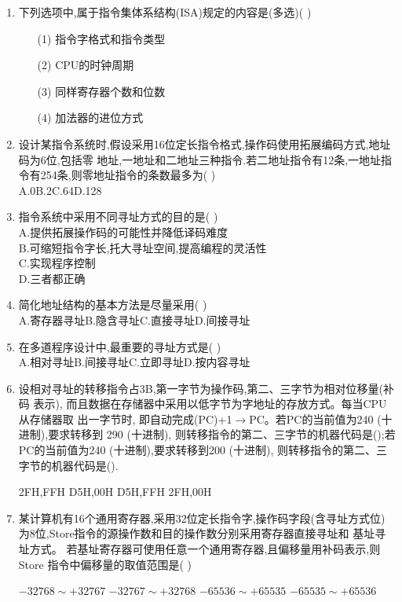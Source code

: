\documentclass[12pt, a4paper, oneside, UTF8]{ctexbook}
\begin{document}
\begin{enumerate}
    \item \bt 下列选项中,属于指令集体系结构(ISA)规定的内容是(多选)(    )
    \begin{enumerate}
        \item [(1)] 指令字格式和指令类型 
        \item [(2)] CPU的时钟周期 
        \item [(3)] 同样寄存器个数和位数 
        \item [(4)] 加法器的进位方式
    \end{enumerate}

    \item \bt 设计某指令系统时,假设采用16位定长指令格式,操作码使用拓展编码方式,地址码为6位,包括零
    地址,一地址和二地址三种指令.若二地址指令有12条,一地址指令有254条,则零地址指令的条数最多为(   )\\
    A.0\qquad B.2\qquad C.64\qquad D.128

    \item 指令系统中采用不同寻址方式的目的是(   )\\
    A.提供拓展操作码的可能性并降低译码难度 \\
    B.可缩短指令字长,托大寻址空间,提高编程的灵活性 \\
    C.实现程序控制 \\
    D.三者都正确 

    \item 简化地址结构的基本方法是尽量采用(   ) \\
    A.寄存器寻址\qquad B.隐含寻址\qquad C.直接寻址\qquad D.间接寻址 

    \item 在多道程序设计中,最重要的寻址方式是(   ) \\
    A.相对寻址\qquad B.间接寻址\qquad C.立即寻址\qquad D.按内容寻址
    
    \item 设相对寻址的转移指令占3B,第一字节为操作码,第二、三字节为相对位移量(补码 表示),
    而且数据在存储器中采用以低字节为字地址的存放方式。每当CPU从存储器取 出一字节时,
    即自动完成(PC)+1$\rightarrow$PC。若PC的当前值为240 (十进制),要求转移到 290 (十进制),
    则转移指令的第二、三字节的机器代码是();若PC的当前值为240 (十进制),要求转移到200 (十进制),
    则转移指令的第二、三字节的机器代码是().
    \begin{choices}
        \task 2FH,FFH 
        \task D5H,00H 
        \task D5H,FFH 
        \task 2FH,00H
    \end{choices}

    \item 某计算机有16个通用寄存器,采用32位定长指令字,操作码字段(含寻址方式位)为8位,Store指令的源操作数和目的操作数分别采用寄存器直接寻址和 基址寻址方式。
    若基址寄存器可使用任意一个通用寄存器,且偏移量用补码表示,则Store 指令中偏移量的取值范围是(   ) 
    \begin{choices}[2]
        \task $-32768\sim +32767$ \task $-32767\sim +32768$ 
        \task $-65536\sim +65535$ \task $-65535\sim +65536$ 
    \end{choices}



\end{enumerate}
\end{document}
